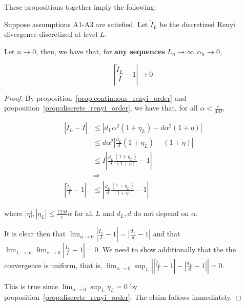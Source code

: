 \documentclass{article}
\begin{document}
These propositions together imply the following:
\begin{shaded}
\begin{theorem}
\label{thm:relative_convergence_discrete_continuous_renyi}
Suppose assumptions A1-A3 are satisfied. Let $\tilde{I}_L$ be the discretized Renyi divergence discretized at level $L$.

Let $n \rightarrow 0$, then, we have that, for \textbf{any sequences} $L_n \rightarrow \infty, \alpha_n \rightarrow 0$,

\[
 \left| \frac{\tilde{I}_L}{I} - 1 \right| \rightarrow 0
\]

\end{theorem}
\end{shaded}

\begin{proof}


By proposition~\ref{prop:continuous_renyi_order} and proposition~\ref{prop:discrete_renyi_order}, we have that, for all $\alpha < \frac{c}{4M}$,

\begin{align*}
| \tilde{I}_L - I | 
 & \leq \left| d_L \alpha^2 ( 1 + \eta_L) - d \alpha^2 ( 1 + \eta) \right| \\
  &\leq d\alpha^2 \left| \frac{d_L}{d} (1 + \eta_L) - (1+\eta) \right|  \\
 &\leq I \left| \frac{d_L}{d} \frac{(1 + \eta_L)}{(1+\eta)} - 1 \right| \\
& \Rightarrow \\
\left| \frac{\tilde{I}_L}{I} - 1 \right| &\leq 
\left | \frac{d_L}{d} \frac{(1+\eta_L)}{1 + \eta} - 1 \right|
\end{align*}

where $|\eta|, |\eta_L| \leq \frac{12M}{c} \alpha$ for all $L$ and $d_L, d$ do not depend on $\alpha$.

It is clear then that $\lim_{\alpha \rightarrow 0} \left| \frac{\tilde{I}_L}{I} - 1 \right| = \left| \frac{d_L}{d} - 1 \right|$ and that $\lim_{L \rightarrow \infty} \lim_{\alpha \rightarrow 0} 
\left| \frac{\tilde{I}_L}{I} - 1 \right| = 0$.  
We need to show additionally that the the convergence is uniform, that is, 
$\lim_{\alpha \rightarrow 0} \sup_L 
\left| \left| \frac{\tilde{I}_L}{I} - 1 \right| - \left|  \frac{d_L}{d} - 1  \right| \right| = 0$.

This is true since $\lim_{\alpha \rightarrow 0} \sup_L \eta_L = 0$ by proposition~\ref{prop:discrete_renyi_order}. The claim follows immediately.
\end{proof}
\end{document}
